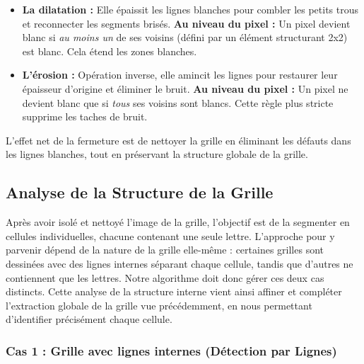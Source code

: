 \documentclass{article}
\begin{document}
\begin{itemize}
    \item \textbf{La dilatation :} Elle épaissit les lignes blanches pour combler les petits trous et reconnecter les segments brisés.
    \newline\textbf{Au niveau du pixel :} Un pixel devient blanc si \textit{au moins un} de ses voisins (défini par un élément structurant 2x2) est blanc. Cela étend les zones blanches.

    \item \textbf{L'érosion :} Opération inverse, elle amincit les lignes pour restaurer leur épaisseur d'origine et éliminer le bruit.
    \newline\textbf{Au niveau du pixel :} Un pixel ne devient blanc que si \textit{tous} ses voisins sont blancs. Cette règle plus stricte supprime les taches de bruit.
\end{itemize}

L'effet net de la fermeture est de nettoyer la grille en éliminant les défauts dans les lignes blanches, tout en préservant la structure globale de la grille.

\subsection{Analyse de la Structure de la Grille}

Après avoir isolé et nettoyé l'image de la grille, l'objectif est de la segmenter en cellules individuelles, chacune contenant une seule lettre. L'approche pour y parvenir dépend de la nature de la grille elle-même : certaines grilles sont dessinées avec des lignes internes séparant chaque cellule, tandis que d'autres ne contiennent que les lettres. Notre algorithme doit donc gérer ces deux cas distincts.
Cette analyse de la structure interne vient ainsi affiner et compléter l'extraction globale de la grille vue précédemment, en nous permettant d'identifier précisément chaque cellule.

\subsubsection{Cas 1 : Grille avec lignes internes (Détection par Lignes)}
\end{document}
